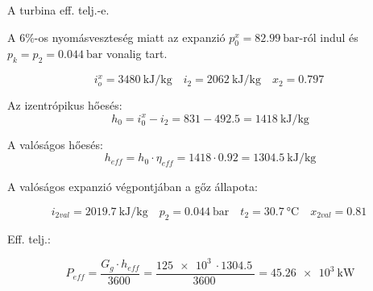 \noindent\hrulefill

\vspace{2mm}

\noindent A turbina eff. telj.-e.

\vspace{2mm}

\noindent A ${6}{\%}$-os nyomásveszteség miatt az expanzió $p_0^{x} = \SI{82.99}{\bar}$-ról indul és $p_k = p_2 = \SI{0.044}{\bar}$ vonalig tart.

\begin{equation*}
	i_o^{x} = \SI{3480}{\kJ\per\kilogram} \quad 
	i_2 = \SI{2062}{\kJ\per\kilogram} \quad 
	x_2 = \SI{0.797}{}
\end{equation*}

\vspace{2mm}

\noindent Az izentrópikus hőesés: 
\begin{equation}
	h_0 = i_0^{x} - i_2 = \SI{831} - \SI{492.5} = \SI{1418}{\kJ\per\kilogram}
\end{equation}

\vspace{2mm}

\noindent A valóságos hőesés:
\begin{equation}
	h_{\textit{eff}} = h_0 \cdot \eta_{\textit{eff}} = \SI{1418} \cdot \SI{0.92} = \SI{1304.5}{\kJ\per\kilogram}
\end{equation}

\vspace{2mm}

\noindent A valóságos expanzió végpontjában a gőz állapota:

\vspace{2mm}

\begin{equation*}
i_{\textit{2val}} = \SI{2019.7}{\kJ\per\kilogram} \quad 
p_2 = \SI{0.044}{\bar} \quad 
t_2 = \SI{30.7}{\celsius} \quad 
x_{\textit{2val}} = \SI{0.81}{}
\end{equation*}

\vspace{2mm}

\noindent Eff. telj.:

\begin{equation}
	P_{\textit{eff}} = \dfrac{G_g \cdot h_{eff}}{\SI{3600}{}} = \dfrac{\SI{125e3}{} \cdot \SI{1304.5}{}}{\SI{3600}{}} = \SI{45.26e3}{\kW}
\end{equation}

\vspace{2mm}

